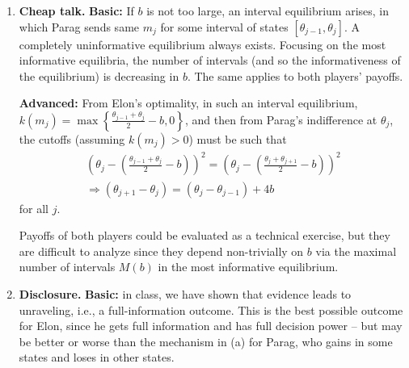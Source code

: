 \documentclass[a4paper]{article}
\begin{document}
\begin{enumerate}[label={(\alph{enumi})}]
	\item \textbf{Cheap talk.}
	\textbf{Basic:} If $b$ is not too large, an interval equilibrium arises, in which Parag sends same $m_j$ for some interval of states $[\theta_{j-1},\theta_{j}]$. A completely uninformative equilibrium always exists. Focusing on the most informative equilibria, the number of intervals (and so the informativeness of the equilibrium) is decreasing in $b$. The same applies to both players' payoffs.
	
	\textbf{Advanced:} From Elon's optimality, in such an interval equilibrium, $k(m_j) = \max \left\{ \frac{\theta_{j-1} + \theta_{j}}{2}-b, 0\right\}$, and then from Parag's indifference at $\theta_{j}$, the cutoffs (assuming $k(m_j)>0$) must be such that 
	\begin{align*}
		\left(\theta_{j} - \left( \frac{\theta_{j-1} + \theta_{j}}{2} - b \right) \right)^2 = \left(\theta_{j} - \left( \frac{\theta_{j} + \theta_{j+1}}{2} - b \right) \right)^2
		\\
		\Rightarrow (\theta_{j+1} - \theta_j) = (\theta_j - \theta_{j-1}) + 4b
	\end{align*}
	for all $j$.
	
	Payoffs of both players could be evaluated as a technical exercise, but they are difficult to analyze since they depend non-trivially on $b$ via the maximal number of intervals $M(b)$ in the most informative equilibrium.
	
	
	
	\item \textbf{Disclosure.}
	\textbf{Basic:} in class, we have shown that evidence leads to unraveling, i.e., a full-information outcome. This is the best possible outcome for Elon, since he gets full information and has full decision power -- but may be better or worse than the mechanism in (a) for Parag, who gains in some states and loses in other states.
	

\end{enumerate}
\end{document}

